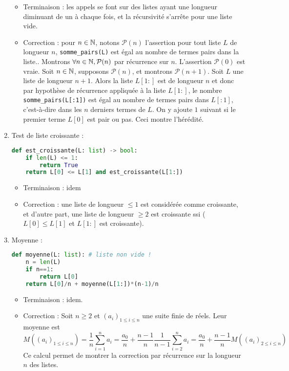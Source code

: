 \documentclass[11pt,a4paper]{article}
\begin{document}
\begin{enumerate}
\begin{itemize}
\item Terminaison : les appels se font sur des listes ayant une longueur diminuant de un à chaque fois, et la récursivité s'arrête pour une liste vide.
\item Correction : pour $n\in \mathbb{N}$, notons $\mathcal P(n)$ l'assertion \og pour tout liste $L$ de longueur $n$, \verb+somme_pairs(L)+ est égal au nombre de termes pairs dans la liste.\fg. Montrons $\forall n\in \mathbb{N}, \mathcal{P}(n)$ par récurrence sur $n$. L'assertion $\mathcal P(0)$ est vraie. Soit $n\in \mathbb{N}$, supposons $\mathcal{P}(n)$, et montrons $\mathcal{P}(n+1)$. Soit $L$ une liste de longueur $n+1$. Alors la liste $L[1:]$ est de longueur $n$ et donc par hypothèse de récurrence appliquée à la liste $L[1:]$, le nombre \verb+somme_pairs(L[:1])+ est égal au nombre de termes pairs dans $L[:1]$, c'est-à-dire dans les $n$ derniers termes de $L$. On y ajoute $1$ suivant si le premier terme $L[0]$ est pair ou pas. Ceci montre l'hérédité.
\end{itemize}
\item Test de liste croissante : 
\begin{lstlisting}[language=Python]
def est_croissante(L: list) -> bool:
	if len(L) <= 1:
		return True
	return L[0] <= L[1] and est_croissante(L[1:])
\end{lstlisting}
\begin{itemize}
\item Terminaison : idem
\item Correction : une liste de longueur $\leq 1$ est considérée comme croissante, et d'autre part, une liste de longueur $\geq 2$ est croissante ssi ($L[0]\leq L[1]$ et $L[1:]$ est croissante).
\end{itemize}
\item Moyenne : 
\begin{lstlisting}[language=Python]
def moyenne(L: list): # liste non vide !
	n = len(L)
	if n==1:
		return L[0]
	return L[0]/n + moyenne(L[1:])*(n-1)/n
\end{lstlisting}
\begin{itemize}
\item Terminaison : idem.
\item Correction : Soit $n\geq 2$ et $(a_i)_{1\leq i \leq n}$ une suite finie de réels. Leur moyenne est 
\[ M\left((a_i)_{1\leq i \leq n}\right) = \frac{1}{n}\sum_{i=1}^n a_i = \frac{a_0}{n} + \frac{n-1}{n}\frac{1}{n-1}\sum_{i=2}^na_i
= \frac{a_0}{n} + \frac{n-1}{n}M\left((a_i)_{2\leq i \leq n}\right)
\]
Ce calcul permet de montrer la correction par récurrence sur la longueur $n$ des listes.
\end{itemize}
\end{enumerate}
\end{document}
